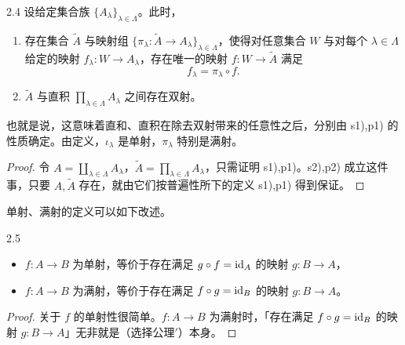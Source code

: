 \begin{lemma}{2.4} 设给定集合族 $\{A_\lambda\}_{\lambda\in\Lambda}$。此时，
\begin{enumerate}[label=p\arabic*), leftmargin=*]
  \item 存在集合 $\tilde{A}$ 与映射组 $\{\pi_\lambda\colon \tilde{A}\to A_\lambda\}_{\lambda\in\Lambda}$，使得对任意集合 $W$ 与对每个 $\lambda\in\Lambda$ 给定的映射 $f_\lambda\colon W\to A_\lambda$，存在唯一的映射 $f\colon W\to\tilde{A}$ 满足
  \[
    f_\lambda = \pi_\lambda\circ f .
  \]
  \item $\tilde{A}$ 与直积 $\prod_{\lambda\in\Lambda}A_\lambda$ 之间存在双射。
\end{enumerate}
\end{lemma}

也就是说，这意味着直和、直积在除去双射带来的任意性之后，分别由 s1),p1) 的性质确定。由定义，$\iota_\lambda$ 是单射，$\pi_\lambda$ 特别是满射。


\begin{proof}
令 $A = \coprod_{\lambda\in\Lambda}A_\lambda$，$\tilde{A} = \prod_{\lambda\in\Lambda}A_\lambda$，只需证明 s1),p1)。s2),p2) 成立这件事，只要 $A,\tilde{A}$ 存在，就由它们按普遍性所下的定义 s1),p1) 得到保证。
\end{proof}

单射、满射的定义可以如下改述。

\begin{lemma}{2.5}
\begin{itemize}
  \item $f\colon A\to B$ 为单射，等价于存在满足 $g\circ f=\mathrm{id}_A$ 的映射 $g\colon B\to A$，
  \item $f\colon A\to B$ 为满射，等价于存在满足 $f\circ g=\mathrm{id}_B$ 的映射 $g\colon B\to A$。
\end{itemize}
\end{lemma}

\begin{proof}
关于 $f$ 的单射性很简单。$f\colon A\to B$ 为满射时，「存在满足 $f\circ g=\mathrm{id}_B$ 的映射 $g\colon B\to A$」无非就是（选择公理$'$）本身。
\end{proof}

